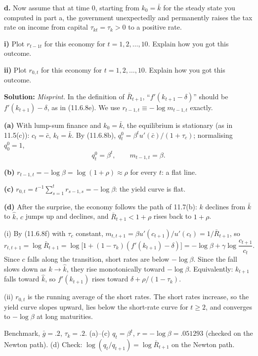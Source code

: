 \documentclass[12pt, letterpaper]{article}
\newcommand{\Rb}{\bar R}
\newcommand{\kb}{\bar k}
\newcommand{\cb}{\bar c}
\newcommand{\gb}{\bar g}
\begin{document}
\begin{tcolorbox}[evenbox,title={Exercise 11.10 \quad Term structure of interest rates}]
\begin{tcolorbox}[questionbox]
\textbf{d.} Now assume that at time 0, starting from $k_0=\bar k$ for the steady state you computed in part a, the
government unexpectedly and permanently raises the tax rate on income from capital $\tau_{kt}=\tau_k>0$ to a positive
rate.

\quad\textbf{i)} Plot $r_{t-1t}$ for this economy for $t=1,2,\dots,10$. Explain how you got this outcome.

\quad\textbf{ii)} Plot $r_{0,t}$ for this economy for $t=1,2,\dots,10$. Explain how you got this outcome.
\end{tcolorbox}

\textbf{Solution:} \emph{Misprint.} In the definition of $\Rb_{t+1}$, ``$f'(k_{t+1}-\delta)$'' should be
$f'(k_{t+1})-\delta$, as in (11.6.8e). We use $r_{t-1,t}\equiv-\log m_{t-1,t}$ exactly.

\textbf{(a)} With lump-sum finance and $k_0=\kb$, the equilibrium is stationary (as in 11.5(c)): $c_t=\cb$, $k_t=\kb$. By
(11.6.8b), $q^0_t=\beta^tu'(\cb)/(1+\tau_c)$; normalising $q^0_0=1$,
\[
q^0_t=\beta^t,\qquad m_{t-1,t}=\beta .
\]

\textbf{(b)} $r_{t-1,t}=-\log\beta=\log(1+\rho)\approx\rho$ for every $t$: a flat line.

\textbf{(c)} $r_{0,t}=t^{-1}\sum_{s=1}^tr_{s-1,s}=-\log\beta$: the yield curve is flat.

\textbf{(d)} After the surprise, the economy follows the path of 11.7(b): $k$ declines from $\kb$ to $\hat k$, $c$ jumps up
and declines, and $\Rb_{t+1}<1+\rho$ rises back to $1+\rho$.

(i) By (11.6.8f) with $\tau_c$ constant,
$m_{t,t+1}=\beta u'(c_{t+1})/u'(c_t)=1/\Rb_{t+1}$, so
\[
r_{t,t+1}=\log\Rb_{t+1}=\log\big[1+(1-\tau_k)(f'(k_{t+1})-\delta)\big]=-\log\beta+\gamma\log\frac{c_{t+1}}{c_t}.
\]
Since $c$ falls along the transition, short rates are below $-\log\beta$. Since the fall slows down as $k\to\hat k$, they rise
monotonically toward $-\log\beta$. Equivalently: $k_{t+1}$ falls toward $\hat k$, so $f'(k_{t+1})$ rises toward
$\delta+\rho/(1-\tau_k)$.

(ii) $r_{0,t}$ is the running average of the short rates. The short rates increase, so the yield curve slopes upward, lies
below the short-rate curve for $t\ge2$, and converges to $-\log\beta$ at long maturities.

\begin{tcolorbox}[databox]
Benchmark, $\gb=.2$, $\tau_k=.2$. (a)--(c) $q_t=\beta^t$, $r=-\log\beta=.051293$ (checked on the Newton path).
(d) Check: $\log(q_t/q_{t+1})=\log\Rb_{t+1}$ on the Newton path.


\end{tcolorbox}
\end{tcolorbox}
\end{document}
